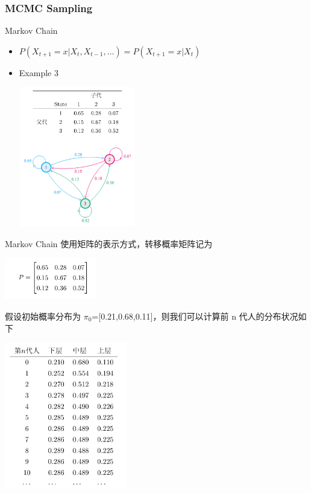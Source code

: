 \documentclass{beamer}
\begin{document}
\begin{CJK*}{UTF8}{gbsn}
\subsubsection{MCMC Sampling}
\begin{frame}{Markov Chain}
\begin{center}
\begin{itemize}
	\item $P(X_{t+1}=x|X_t,X_{t-1},\dots )=P(X_{t+1}=x|X_t)$
	\item Example 3\\
		\begin{center}
      \includegraphics[width=0.4\textwidth]{picture/MC1.png}
   	 \end{center}
\end{itemize}
\end{center}
\end{frame}

\begin{frame}{Markov Chain}
使用矩阵的表示方式，转移概率矩阵记为
	\begin{center}
      \includegraphics[width=0.3\textwidth]{picture/MC2.png}
   	 \end{center} 假设初始概率分布为 $\pi_0$=[0.21,0.68,0.11]，则我们可以计算前 n 代人的分布状况如下
   	 \begin{center}
      \includegraphics[width=0.4\textwidth]{picture/MC3.png}
   	 \end{center}
\end{frame}


\end{CJK*}
\end{document}
